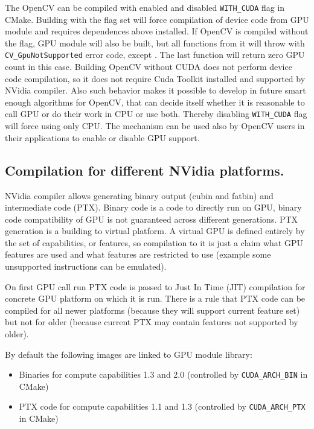 The OpenCV can be compiled with enabled and disabled \texttt{WITH\_CUDA} flag in CMake. Building with the flag set will force compilation of device code from GPU module and requires dependences above installed. If OpenCV is compiled without the flag, GPU module will also be built, but all functions from it will throw  with \texttt{CV\_GpuNotSupported} error code, except . The last function will return zero GPU count in this case.  Building OpenCV without CUDA does not perform device code compilation, so it does not require Cuda Toolkit installed and supported by NVidia compiler. Also such behavior makes it possible to develop in future smart enough algorithms for OpenCV, that can decide itself whether it is reasonable to call GPU or do their work in CPU or use both. Thereby disabling \texttt{WITH\_CUDA} flag will force using only CPU. The mechanism can be used also by OpenCV users in their applications to enable or disable GPU support.

\subsection{Compilation for different NVidia platforms.}

NVidia compiler allows generating binary output (cubin and fatbin) and intermediate code (PTX). Binary code is a code to directly run on GPU, binary code compatibility of GPU is not guaranteed across different generations. PTX generation is a building to virtual platform. A virtual GPU is defined entirely by the set of capabilities, or features, so compilation to it is just a claim what GPU features are used and what features are restricted to use (example some unsupported instructions can be emulated).

On first GPU call run PTX code is passed to Just In Time (JIT) compilation for concrete GPU platform on which it is run. There is a rule that PTX code can be compiled for all newer platforms (because they will support current feature set) but not for older (because current PTX may contain features not supported by older). 

By default the following images are linked to GPU module library:
\begin{itemize}
\item Binaries for compute capabilities 1.3 and 2.0 (controlled by \texttt{CUDA\_ARCH\_BIN} in CMake)
\item PTX code for compute capabilities 1.1 and 1.3 (controlled by \texttt{CUDA\_ARCH\_PTX} in CMake)
\end{itemize}

